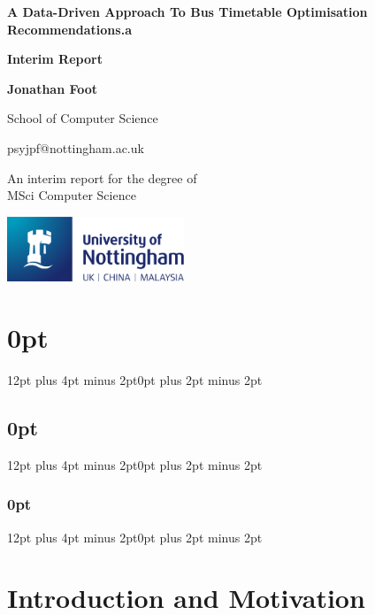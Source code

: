 \documentclass{article}
\begin{document}
\begin{titlepage}
	\begin{center}
		\vspace*{1cm}
		\Huge
		\textbf{A Data-Driven Approach To Bus Timetable Optimisation Recommendations.a}
		
		\LARGE
		\vspace{0.5cm}
		\textbf{Interim Report}
		
		\vspace{1.5cm}
				
		\textbf{Jonathan Foot}
		
		School of Computer Science
		
		psyjpf@nottingham.ac.uk
		
		
		\vspace{2.5cm}
		
		An interim report for the degree of\\
		MSci Computer Science
		
		
		\vfill
		
		\includegraphics[width=200px]{images/nottingham-logo.png}
	\end{center}
\end{titlepage}

\tableofcontents


\newpage

\setcounter{page}{1}
\setlength{\parindent}{2em}
\setlength{\parskip}{1em}
\setlength{\belowcaptionskip}{-10pt}
\titlespacing\section{0pt}{12pt plus 4pt minus 2pt}{0pt plus 2pt minus 2pt}
\titlespacing\subsection{0pt}{12pt plus 4pt minus 2pt}{0pt plus 2pt minus 2pt}
\titlespacing\subsubsection{0pt}{12pt plus 4pt minus 2pt}{0pt plus 2pt minus 2pt}


\section{Introduction and Motivation}
\end{document}
